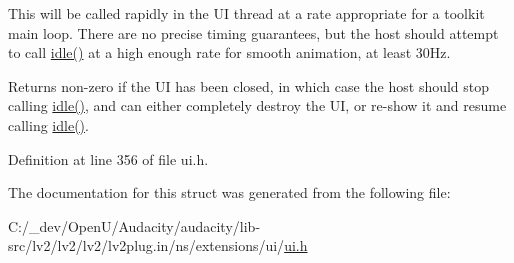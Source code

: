 This will be called rapidly in the UI thread at a rate appropriate for a toolkit main loop. There are no precise timing guarantees, but the host should attempt to call \hyperlink{struct___l_v2_u_i___idle___interface_ae8365fae89d5951f6727f59eebc15dac}{idle()} at a high enough rate for smooth animation, at least 30\+Hz.

\begin{DoxyReturn}{Returns}
non-\/zero if the UI has been closed, in which case the host should stop calling \hyperlink{struct___l_v2_u_i___idle___interface_ae8365fae89d5951f6727f59eebc15dac}{idle()}, and can either completely destroy the UI, or re-\/show it and resume calling \hyperlink{struct___l_v2_u_i___idle___interface_ae8365fae89d5951f6727f59eebc15dac}{idle()}. 
\end{DoxyReturn}


Definition at line 356 of file ui.\+h.



The documentation for this struct was generated from the following file\+:\begin{DoxyCompactItemize}
\item 
C\+:/\+\_\+dev/\+Open\+U/\+Audacity/audacity/lib-\/src/lv2/lv2/lv2/lv2plug.\+in/ns/extensions/ui/\hyperlink{ui_8h}{ui.\+h}\end{DoxyCompactItemize}
